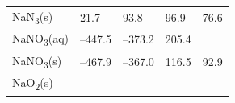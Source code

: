 \documentclass[
]{book}
\theoremstyle{definition}
\theoremstyle{definition}
\theoremstyle{definition}
\theoremstyle{remark}
\begin{document}
\begin{longtable}[]{@{}lllll@{}}
\begin{minipage}[t]{0.10\columnwidth}\raggedright
NaN\textsubscript{3}(s)\strut
\end{minipage} & \begin{minipage}[t]{0.19\columnwidth}\raggedright
21.7\strut
\end{minipage} & \begin{minipage}[t]{0.20\columnwidth}\raggedright
93.8\strut
\end{minipage} & \begin{minipage}[t]{0.18\columnwidth}\raggedright
96.9\strut
\end{minipage} & \begin{minipage}[t]{0.18\columnwidth}\raggedright
76.6\strut
\end{minipage}\tabularnewline
\begin{minipage}[t]{0.10\columnwidth}\raggedright
NaNO\textsubscript{3}(aq)\strut
\end{minipage} & \begin{minipage}[t]{0.19\columnwidth}\raggedright
--447.5\strut
\end{minipage} & \begin{minipage}[t]{0.20\columnwidth}\raggedright
--373.2\strut
\end{minipage} & \begin{minipage}[t]{0.18\columnwidth}\raggedright
205.4\strut
\end{minipage} & \begin{minipage}[t]{0.18\columnwidth}\raggedright
\strut
\end{minipage}\tabularnewline
\begin{minipage}[t]{0.10\columnwidth}\raggedright
NaNO\textsubscript{3}(s)\strut
\end{minipage} & \begin{minipage}[t]{0.19\columnwidth}\raggedright
--467.9\strut
\end{minipage} & \begin{minipage}[t]{0.20\columnwidth}\raggedright
--367.0\strut
\end{minipage} & \begin{minipage}[t]{0.18\columnwidth}\raggedright
116.5\strut
\end{minipage} & \begin{minipage}[t]{0.18\columnwidth}\raggedright
92.9\strut
\end{minipage}\tabularnewline
\begin{minipage}[t]{0.10\columnwidth}\raggedright
NaO\textsubscript{2}(s)\strut
\end{minipage} & \begin{minipage}[t]{0.19\columnwidth}\raggedright

\end{minipage}
\end{longtable}
\end{document}
